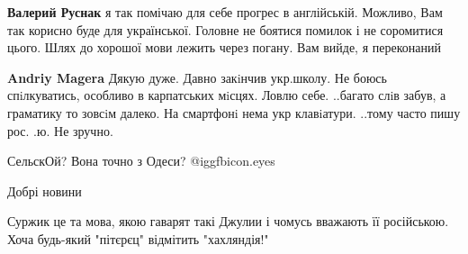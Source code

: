 \begin{itemize}
 

\textbf{Валерий Руснак} я так помічаю для себе прогрес в англійській. Можливо, Вам так корисно буде для української. Головне не боятися помилок і не соромитися цього. Шлях до хорошої мови лежить через погану. Вам вийде, я переконаний

 
\textbf{Andriy Magera} Дякую дуже.
Давно закiнчив укр.школу. Не боюсь спiлкуватись, особливо в карпатських мiсцях. Ловлю себе. ..багато слiв забув, а граматику то зовсiм далеко.
На смартфонi нема укр клавiатури. ..тому часто пишу рос. .ю. Не зручно.

\end{itemize} %

 
СельскОй? Вона точно з Одеси?  @igg{fbicon.eyes} 

 
Добрі новини

 
Суржик це та мова, якою гаварят такі Джулии і чомусь вважають її російською.
Хоча будь-який "пітєрєц" відмітить "хахляндія!"


 

